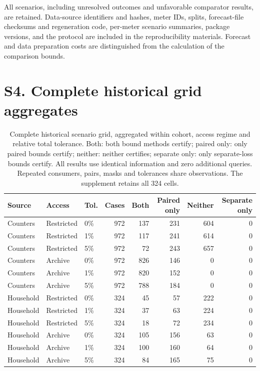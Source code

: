 All scenarios, including unresolved outcomes and unfavorable comparator
results, are retained. Data-source identifiers and hashes, meter IDs, splits,
forecast-file checksums and regeneration code, per-meter scenario summaries,
package versions, and the
protocol are included in the reproducibility materials. Forecast and data
preparation costs are distinguished from the calculation of the comparison
bounds.



\section{S4. Complete historical grid aggregates}\label{app:certificate-grid}
\begin{table}[htbp]
\centering\small\setlength{\tabcolsep}{4pt}
\caption{Complete historical scenario grid, aggregated within cohort, access
regime and relative total tolerance. Both: both bound methods certify;
paired only: only paired bounds certify; neither: neither certifies;
separate only: only separate-loss bounds certify. All results use identical
information and zero additional queries. Repeated consumers, pairs, masks
and tolerances share observations. The supplement retains all 324 cells.}
\label{tab:certificate-grid}
\begin{tabular}{lllrrrrr}
\toprule
Source & Access & Tol. & Cases & Both & Paired only & Neither & Separate only\\
\midrule
Counters & Restricted & 0\% & 972 & 137 & 231 & 604 & 0 \\
Counters & Restricted & 1\% & 972 & 117 & 241 & 614 & 0 \\
Counters & Restricted & 5\% & 972 & 72 & 243 & 657 & 0 \\
Counters & Archive & 0\% & 972 & 826 & 146 & 0 & 0 \\
Counters & Archive & 1\% & 972 & 820 & 152 & 0 & 0 \\
Counters & Archive & 5\% & 972 & 788 & 184 & 0 & 0 \\
Household & Restricted & 0\% & 324 & 45 & 57 & 222 & 0 \\
Household & Restricted & 1\% & 324 & 37 & 63 & 224 & 0 \\
Household & Restricted & 5\% & 324 & 18 & 72 & 234 & 0 \\
Household & Archive & 0\% & 324 & 105 & 156 & 63 & 0 \\
Household & Archive & 1\% & 324 & 100 & 160 & 64 & 0 \\
Household & Archive & 5\% & 324 & 84 & 165 & 75 & 0 \\

\end{tabular}
\end{table}

